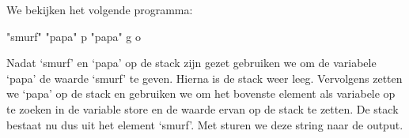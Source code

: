 \begin{exmp}
	We bekijken het volgende programma:
	\begin{smurf}"smurf" "papa" p "papa" g o\end{smurf}
	Nadat `smurf' en `papa' op de stack zijn gezet gebruiken we 
	om de variabele `papa' de waarde `smurf' te geven. Hierna is de stack weer
	leeg. Vervolgens zetten we `papa' op de stack en gebruiken we 
	om het bovenste element als variabele op te zoeken in de variable store en de
	waarde ervan op de stack te zetten. De stack bestaat nu dus uit het element
	`smurf'. Met  sturen we deze string naar de output.
\end{exmp}




